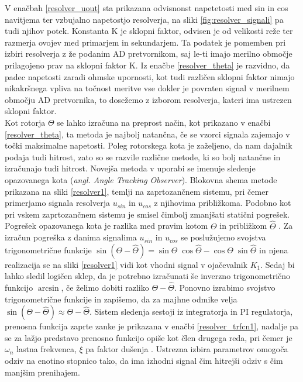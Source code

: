 \documentclass[a4paper,twoside,openright,12pt]{book}
\begin{document}
V enačbah \ref{resolver_uout} sta prikazana odvisnonst napetetosti med sin in cos navitjema ter vzbujalno napetostjo resolverja,  na sliki \ref{fig:resolver_signali} pa tudi njihov potek.
Konstanta K je sklopni faktor, odvisen je od velikosti reže ter razmerja ovojev med primarjem in sekundarjem. Ta podatek je pomemben pri izbiri resolverja z že podanim AD pretvornikom, saj le-ti imajo merilno območje prilagojeno prav na sklopni faktor K. Iz enačbe \ref{resolver_theta} je razvidno, da padec napetosti zaradi ohmske upornosti, kot tudi različen sklopni faktor nimajo nikakršnega vpliva na točnost meritve vse dokler je povraten signal v merilnem območju AD pretvornika, to dosežemo z izborom resolverja, kateri ima ustrezen sklopni faktor.\\
Kot rotorja $\Theta$ se lahko izračuna na preprost način, kot prikazano v enačbi \ref{resolver_theta}, ta metoda je najbolj natančna, če se vzorci signala zajemajo v točki maksimalne napetosti. Poleg rotorskega kota je zaželjeno, da nam dajalnik podaja tudi hitrost, zato so se razvile različne metode, ki so bolj natančne in izračunajo tudi hitrost. Novejša metoda v uporabi se imenuje sledenje opazovanega kota (\textit{angl. Angle Tracking Observer}). Blokovna shema metode prikazana na sliki \ref{resolver1}, temlji na zaprtozančnem sistemu, pri čemer primerjamo signala resolverja $u_{sin}$ in   $u_{cos}$ z njihovima približkoma. Podobno kot pri vskem zaprtozančnem sistemu je smisel čimbolj zmanjšati statični pogrešek. Pogrešek opazovanega kota je razlika med pravim kotom $\Theta$ in  približkom $\hat{\Theta}$ \cite{Reddy-ATO}. Za izračun pogreška z danima signalima  $u_{sin}$ in   $u_{cos}$ se poslužujemo svojstva trigonometrične funkcije $\sin(\Theta - \hat{\Theta}) =  \sin\Theta\;\cos\hat{\Theta} -  \cos\Theta\;\sin\hat{\Theta}$ in njena realizacija se na sliki \ref{resolver1} vidi kot vhodni signal v ojačevalnik $K_1$. Sedaj  bi lahko sledil logičen sklep, da je potrebno izračunati še inverzno trigonometrično funkcijo $\arcsin$, če želimo dobiti razliko $\Theta - \hat{\Theta}$. Ponovno izrabimo svojstvo trigonometrične funkcije in zapišemo, da za majhne odmike velja  $\sin(\Theta - \hat{\Theta}) \approx \Theta - \hat{\Theta} $. Sistem sledenja sestoji iz integratorja in PI regulatorja, prenosna funkcija zaprte zanke je prikazana v enačbi \ref{resolver_trfcn1}, nadalje pa se za lažjo predstavo prenosno funkcijo opiše kot člen drugega reda, pri čemer je $\omega_{n}$ lastna frekvenca, $\xi$ pa faktor dušenja \cite{semiconductor2009using}. Ustrezna izbira parametrov omogoča odziv na enotino stopnico tako, da ima izhodni signal čim hitrejši odziv s čim manjšim prenihajem.
\end{document}
